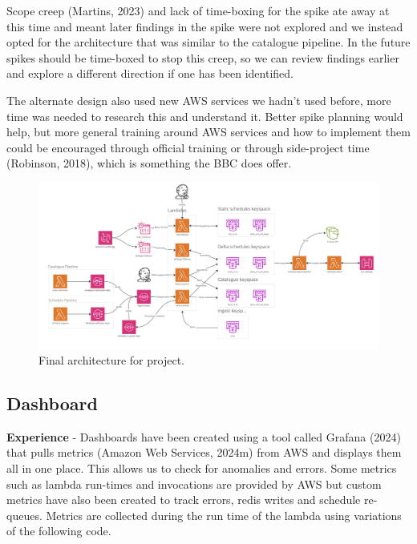   Scope creep (Martins, 2023) and lack of time-boxing for the spike ate away at this time and meant later findings in the spike were not explored and we 
  instead opted for the architecture that was similar to the catalogue pipeline. In the future spikes should be time-boxed to stop this creep, 
  so we can review findings earlier and explore a different direction if one has been identified.

  The alternate design also used new AWS services we hadn't used before, more time was needed to research this and understand it. Better spike planning 
  would help, but more general training around AWS services and how to implement them could be encouraged through official training or through side-project
  time (Robinson, 2018), which is something the BBC does offer.

  \begin{landscape}
    \begin{figure}[H]
      \centering
      \includegraphics[width=20cm]{assets/outputs/finalArchitecture.png}
      \caption{Final architecture for project.}
      \label{fig:finalArchitecture}
    \end{figure}
  \end{landscape}

  \newpage
  \subsection{Dashboard}

  \textbf{Experience} - Dashboards have been created using a tool called Grafana (2024) that pulls metrics (Amazon Web Services, 2024m) from AWS and
  displays them all in one place. This allows us to check for anomalies and errors. Some metrics such as lambda run-times and invocations are provided by 
  AWS but custom metrics have also been created to track errors, redis writes and schedule re-queues. Metrics are collected during the run time of the 
  lambda using variations of the following code.

